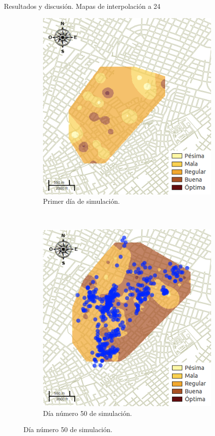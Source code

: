 \begin{frame}[t]{Resultados y discusión. Mapas de interpolación a 24 \textcelsius}
    \begin{figure}
    \begin{subfigure}[b]{0.45\textwidth}
        \includegraphics[width=\textwidth]{./graphics/inicial.png}
        \caption{ Primer día de simulación.}
    \end{subfigure}
    ~~~~
    \begin{subfigure}[b]{0.45\textwidth}
        \includegraphics[width=\textwidth]{./graphics/temp-24-final.png}
        \caption{Día número 50 de simulación.}
    \end{subfigure}
    \end{figure}
\end{frame}


